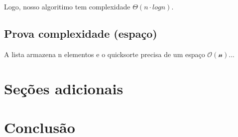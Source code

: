 \documentclass[12pt]{article}
\begin{document}
 	Logo, nosso algoritimo tem complexidade $\Theta(n \cdot logn)$. 
 	
 	\subsection{Prova complexidade (espaço)}
 	A lista armazena n elementos e o quicksorte precisa de um espaço $\mathcal{O(\text{n})}$...
  
 	
 	\section{Seções adicionais}
 	\section{Conclusão}
 	
 	
 
 	
 
\end{document}
